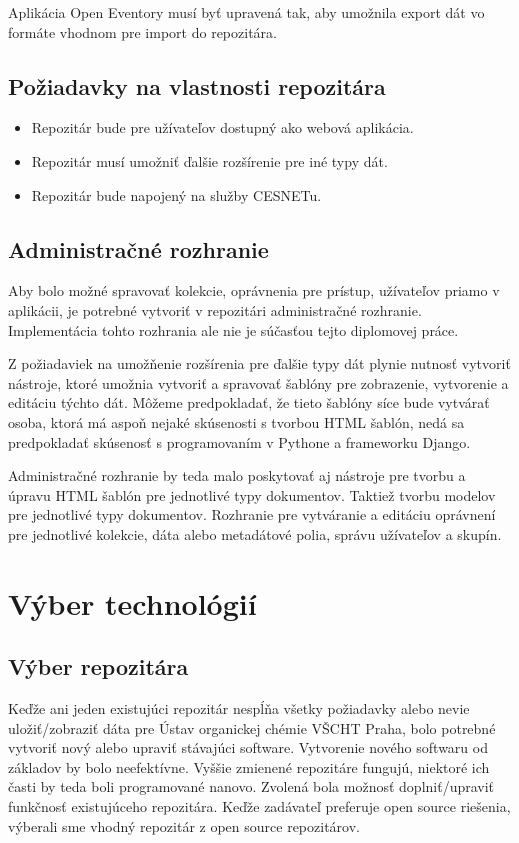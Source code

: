 \documentclass[thesis=M,slovak]{FITthesis}[2013/05/06]
\begin{document}
Aplikácia Open Eventory musí byť upravená tak, aby umožnila export dát vo formáte vhodnom pre import do repozitára.

\subsection{Požiadavky na vlastnosti repozitára}
\begin{itemize}
	\item Repozitár bude pre užívateľov dostupný ako webová aplikácia.
	\item Repozitár musí umožniť ďalšie rozšírenie pre iné typy dát.
	\item Repozitár bude napojený na služby CESNETu.
\end{itemize}

\subsection{Administračné rozhranie}
Aby bolo možné spravovať kolekcie, oprávnenia pre prístup, užívateľov priamo v aplikácii, je potrebné vytvoriť v repozitári administračné rozhranie. Implementácia tohto rozhrania ale nie je súčasťou tejto diplomovej práce.

Z požiadaviek na umožňenie rozšírenia pre ďalšie typy dát plynie nutnosť vytvoriť nástroje, ktoré umožnia vytvoriť a spravovať šablóny pre zobrazenie, vytvorenie a editáciu týchto dát. Môžeme predpokladať, že tieto šablóny síce bude vytvárať osoba, ktorá má aspoň nejaké skúsenosti s tvorbou HTML šablón, nedá sa predpokladať skúsenosť s programovaním v Pythone a frameworku Django. 

Administračné rozhranie by teda malo poskytovať aj nástroje pre tvorbu a úpravu HTML šablón pre jednotlivé typy dokumentov. Taktiež tvorbu modelov pre jednotlivé typy dokumentov.
Rozhranie pre vytváranie a editáciu oprávnení pre jednotlivé kolekcie, dáta alebo metadátové polia, správu užívateľov a skupín.


\section{Výber technológií}
\subsection{Výber repozitára}
Keďže ani jeden existujúci repozitár nespĺňa všetky požiadavky alebo nevie uložiť/zobraziť dáta pre Ústav organickej chémie VŠCHT Praha, bolo potrebné vytvoriť nový alebo upraviť stávajúci software. Vytvorenie nového softwaru od základov by bolo neefektívne. Vyššie zmienené repozitáre fungujú, niektoré ich časti by teda boli programované nanovo. Zvolená bola možnosť doplniť/upraviť funkčnosť existujúceho repozitára. Keďže zadávateľ preferuje open source riešenia, výberali sme vhodný repozitár z open source repozitárov.
\end{document}
